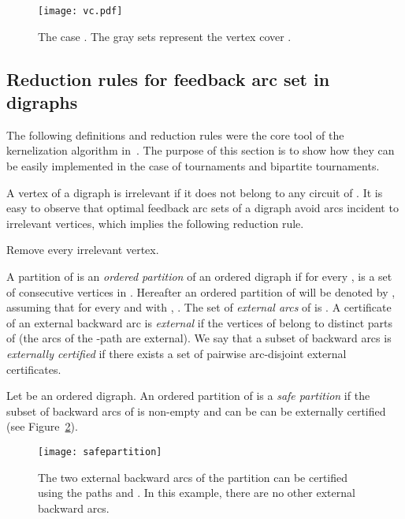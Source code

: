 \begin{figure}[h]
\begin{center}
\centerline{\texttt{[image: vc.pdf]}}
\caption{The case . The gray sets represent the vertex cover .\label{fig:vcrti}}
\end{center}
\end{figure}








\subsection{Reduction rules for feedback arc set in digraphs}

The following definitions and reduction rules were the core tool of the kernelization algorithm in~\cite{BFG+11}. The purpose of this section is to show how they can be easily implemented in the case of tournaments and bipartite tournaments.

A vertex of a digraph  is {irrelevant} if it does not belong to any circuit of . It is easy to observe that  optimal feedback arc sets of a digraph avoid  arcs incident to irrelevant vertices, which implies the following reduction rule.

\begin{polyrule} \label{rule:uselessvertexfast}
Remove every irrelevant vertex.
\end{polyrule}

A partition  of  is an \emph{ordered partition} of an ordered digraph  if for every ,  is a set of consecutive vertices in . Hereafter an ordered partition of  will be denoted by , assuming that for every  and  with , . The set of \emph{external arcs} of  is . A certificate  of an external backward arc  is \emph{external} if the vertices of  belong to distinct parts of  (the arcs of the -path are external). We say that a subset  of backward arcs is \emph{externally certified} if there exists a set  of pairwise arc-disjoint external certificates.
	
	
\begin{definition} 
Let  be an ordered digraph. An ordered partition  of  is a \emph{safe partition} if the subset  of backward arcs of  is non-empty and can be can be externally certified (see Figure~\ref{fig:spfasbt}).
\end{definition}
	
\begin{figure}[h]
\centerline{\texttt{[image: safepartition]}}
\caption{The two external backward arcs of the partition can be certified using the paths  and . In this example, there are no other external backward arcs. \label{fig:spfasbt}}
\end{figure} 
	
